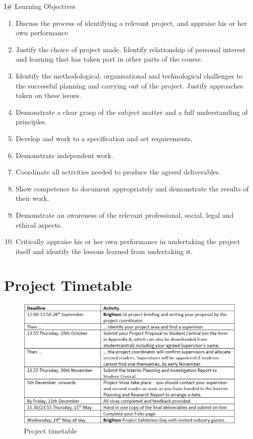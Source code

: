 I\# Learning Objectives

\begin{enumerate}
\def\labelenumi{\arabic{enumi})}
\item
  Discuss the process of identifying a relevant project, and appraise
  his or her own performance
\item
  Justify the choice of project made. Identify relationship of personal
  interest and learning that has taken part in other parts of the
  course.
\item
  Identify the methodological, organisational and technological
  challenges to the successful planning and carrying out of the project.
  Justify approaches taken on these issues.
\item
  Demonstrate a clear grasp of the subject matter and a full
  understanding of principles.
\item
  Develop and work to a specification and set requirements.
\item
  Demonstrate independent work.
\item
  Coordinate all activities needed to produce the agreed deliverables.
\item
  Show competence to document appropriately and demonstrate the results
  of their work.
\item
  Demonstrate an awareness of the relevant professional, social, legal
  and ethical aspects.
\item
  Critically appraise his or her own performance in undertaking the
  project itself and identify the lessons learned from undertaking it.
\end{enumerate}

\section{Project Timetable}\label{project-timetable}

\begin{figure}[htbp]
\centering
\includegraphics{./Images/projecttimetable.png}
\caption{Project timetable}
\end{figure}

